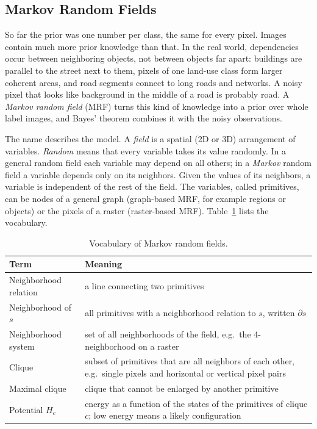 \subsection{Markov Random Fields}

So far the prior was one number per class, the same for every pixel. Images
contain much more prior knowledge than that. In the real world, dependencies
occur between neighboring objects, not between objects far apart: buildings are
parallel to the street next to them, pixels of one land-use class form larger
coherent areas, and road segments connect to long roads and networks. A noisy
pixel that looks like background in the middle of a road is probably road. A
\emph{Markov random field} (MRF) turns this kind of knowledge into a prior over
whole label images, and Bayes' theorem combines it with the noisy observations.

The name describes the model. A \emph{field} is a spatial (2D or 3D)
arrangement of variables. \emph{Random} means that every variable takes its
value randomly. In a general random field each variable may depend on all
others; in a \emph{Markov} random field a variable depends only on its
neighbors. Given the values of its neighbors, a variable is independent of the
rest of the field. The variables, called primitives, can be nodes of a general
graph (graph-based MRF, for example regions or objects) or the pixels of a
raster (raster-based MRF). Table~\ref{tab:mrf-terms} lists the vocabulary.

\begin{table}[ht]
  \centering
  \begin{tabular}{@{}lp{9.6cm}@{}}
    \toprule
    Term & Meaning \\
    \midrule
    Neighborhood relation & a line connecting two primitives \\
    Neighborhood of $s$ & all primitives with a neighborhood relation to $s$,
      written $\partial s$ \\
    Neighborhood system & set of all neighborhoods of the field, e.g.\ the
      4-neighborhood on a raster \\
    Clique & subset of primitives that are all neighbors of each other, e.g.\
      single pixels and horizontal or vertical pixel pairs \\
    Maximal clique & clique that cannot be enlarged by another primitive \\
    Potential $H_c$ & energy as a function of the states of the primitives of
      clique $c$; low energy means a likely configuration \\
    \bottomrule
  \end{tabular}
  \caption{Vocabulary of Markov random fields.}
  \label{tab:mrf-terms}
\end{table}

